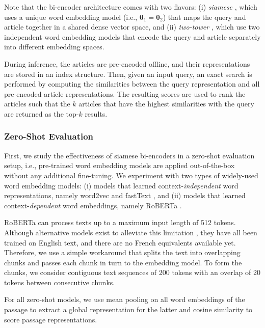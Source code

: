 \documentclass[11pt]{article}
\begin{document}
Note that the bi-encoder architecture comes with two flavors: (i) \textsl{siamese} \citep{reimers2019sentence, xiong2021approximate}, which uses a unique word embedding model (i.e., $\boldsymbol{\theta}_1 = \boldsymbol{\theta}_2$) that maps the query and article together in a shared dense vector space, and (ii) \textsl{two-tower} \citep{yang2020multilingual, karpukhin2020dense}, which use two independent word embedding models that encode the query and article separately into different embedding spaces.

During inference, the articles are pre-encoded offline, and their representations are stored in an index structure. Then, given an input query, an exact search is performed by computing the similarities between the query representation and all pre-encoded article representations. The resulting scores are used to rank the articles such that the $k$ articles that have the highest similarities with the query are returned as the top-$k$ results.



\subsubsection{Zero-Shot Evaluation}
First, we study the effectiveness of siamese bi-encoders in a zero-shot evaluation setup, i.e., pre-trained word embedding models are applied out-of-the-box without any additional fine-tuning. We experiment with two types of widely-used word embedding models: (i) models that learned context-\textit{independent} word representations, namely word2vec \citep{mikolov2013efficient,mikolov2013distributed} and fastText \citep{bojanowski2017enriching}, and (ii) models that learned context-\textit{dependent} word embeddings, namely RoBERTa \citep{liu2019roberta}. 

RoBERTa can process texts up to a maximum input length of 512 tokens. Although alternative models exist to alleviate this limitation \citep{beltagy2020longformer, ainslie2020etc}, they have all been trained on English text, and there are no French equivalents available yet. Therefore, we use a simple workaround that splits the text into overlapping chunks and passes each chunk in turn to the embedding model. To form the chunks, we consider contiguous text sequences of 200 tokens with an overlap of 20 tokens between consecutive chunks.

For all zero-shot models, we use mean pooling on all word embeddings of the passage to extract a global representation for the latter and cosine similarity to score passage representations.
\end{document}
